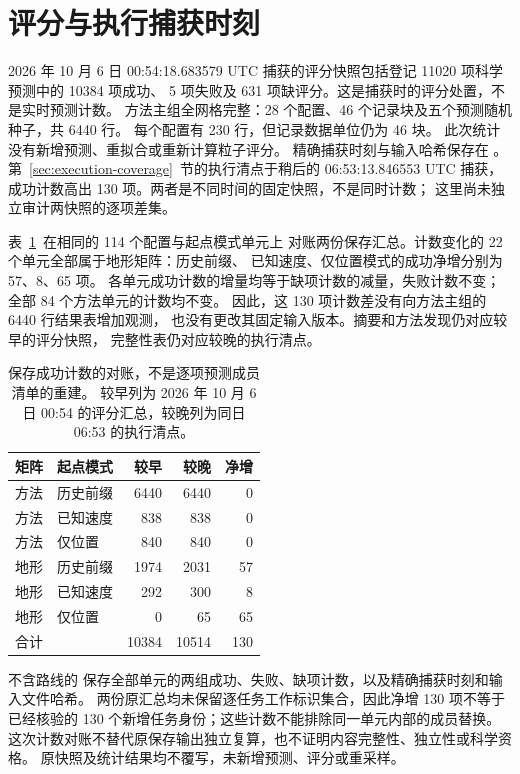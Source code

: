 \section{评分与执行捕获时刻}
\label{sec:score-execution-snapshots}\hypertarget{sec:score-execution-snapshots}{}
2026 年 10 月 6 日 00:54:18.683579 UTC 捕获的评分快照包括登记 11020 项科学预测中的 10384 项成功、
5 项失败及 631 项缺评分。这是捕获时的评分处置，不是实时预测计数。
方法主组全网格完整：28 个配置、46 个记录块及五个预测随机种子，共 6440 行。
每个配置有 230 行，但记录数据单位仍为 46 块。
此次统计没有新增预测、重拟合或重新计算粒子评分。
精确捕获时刻与输入哈希保存在
。
第~\ref{sec:execution-coverage}~节的执行清点于稍后的 06:53:13.846553 UTC 捕获，
成功计数高出 130 项。两者是不同时间的固定快照，不是同时计数；
这里尚未独立审计两快照的逐项差集。

表~\ref{tab:capture-count-difference}~在相同的 114 个配置与起点模式单元上
对账两份保存汇总。计数变化的 22 个单元全部属于地形矩阵：历史前缀、
已知速度、仅位置模式的成功净增分别为 57、8、65 项。
各单元成功计数的增量均等于缺项计数的减量，失败计数不变；
全部 84 个方法单元的计数均不变。
因此，这 130 项计数差没有向方法主组的 6440 行结果表增加观测，
也没有更改其固定输入版本。摘要和方法发现仍对应较早的评分快照，
完整性表仍对应较晚的执行清点。

\begin{table}[htbp]
\centering\small
\caption{保存成功计数的对账，不是逐项预测成员清单的重建。
较早列为 2026 年 10 月 6 日 00:54 的评分汇总，较晚列为同日 06:53 的执行清点。}
\label{tab:capture-count-difference}\hypertarget{tab:capture-count-difference}{}
\begin{tabular}{@{}llrrr@{}}
\toprule
矩阵 & 起点模式 & 较早 & 较晚 & 净增\\
\midrule
方法 & 历史前缀 & 6440 & 6440 & 0\\
方法 & 已知速度 & 838 & 838 & 0\\
方法 & 仅位置 & 840 & 840 & 0\\
地形 & 历史前缀 & 1974 & 2031 & 57\\
地形 & 已知速度 & 292 & 300 & 8\\
地形 & 仅位置 & 0 & 65 & 65\\
\midrule
合计 & & 10384 & 10514 & 130\\
\bottomrule
\end{tabular}
\end{table}

不含路线的 
保存全部单元的两组成功、失败、缺项计数，以及精确捕获时刻和输入文件哈希。
两份原汇总均未保留逐任务工作标识集合，因此净增 130 项不等于已经核验的
130 个新增任务身份；这些计数不能排除同一单元内部的成员替换。
这次计数对账不替代原保存输出独立复算，也不证明内容完整性、独立性或科学资格。
原快照及统计结果均不覆写，未新增预测、评分或重采样。

